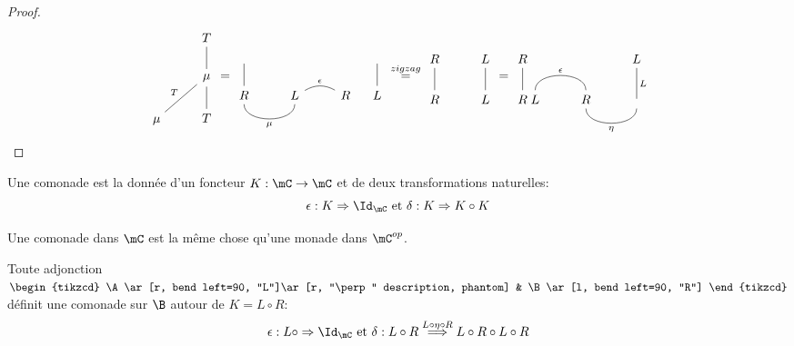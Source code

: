 \documentclass[math, info]{cours}
\begin{document}
\begin{proof}
\begin{equation*}
\begin{tikzcd}
			&T\\
			&|[alias=mu]|\mu\ar[u, no head]\\
			|[alias=mu2]|\mu\ar[ur, "T", no head] & T\ar[u, no head]
		\end{tikzcd}
		=
		\begin{tikzcd}
			\phantom{} & & &[-15pt] \phantom{}\\
			R\ar[u, no head]\ar[r, bend right=90, no head, "\mu"'] & L\ar[r, bend left, "\epsilon", no head] & R & L\ar[u, no head]
		\end{tikzcd}
		\overset{zigzag}{=}
		\begin{tikzcd}
			R & L\\
			R\ar[u, no head] & L\ar[u, no head]
		\end{tikzcd}
		=
		\begin{tikzcd}
			R &[-30pt] & & L\\
			R\ar[u, no head] & L\ar[r, "\epsilon", bend left=90, no head] & R & \phantom{}\ar[u, no head, "L"']\ar[l, bend left=90, "\eta", no head]
		\end{tikzcd}
	\end{equation*}
\end{proof}

\begin{definition}
	Une comonade est la donnée d'un foncteur $K: \mC \to \mC$ et de deux transformations naturelles:
	\begin{equation*}
		\epsilon: K \Rightarrow \Id_{\mC} \text{ et } \delta: K \Rightarrow K\circ K
	\end{equation*}
\end{definition}
\begin{remarque}
	Une comonade dans $\mC$ est la même chose qu'une monade dans $\mC^{op}$.
\end{remarque}

\begin{proposition}
	Toute adjonction $\begin{tikzcd}
		\A\ar[r, bend left=90, "L"]\ar[r, "\perp" description, phantom] & \B\ar[l, bend left=90, "R"]
	\end{tikzcd}$
	définit une comonade sur $\B$ autour de $K = L \circ R$:
	\begin{equation*}
		\epsilon: L\circ \Rightarrow\Id_{\mC} \text{ et } \delta: L\circ R \overset{L \circ \eta\circ R}{\Longrightarrow} L\circ R \circ L \circ R
	\end{equation*}
\end{proposition}
\end{document}
